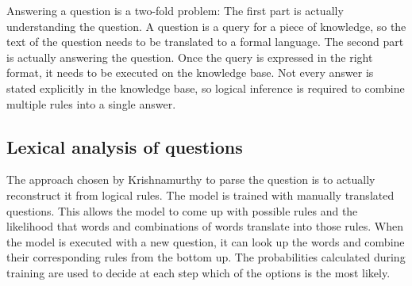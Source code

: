 Answering a question is a two-fold problem: The first part is actually understanding the question. A question is a query for a piece of knowledge, so the text of the question needs to be translated to a formal language. The second part is actually answering the question. Once the query is expressed in the right format, it needs to be executed on the knowledge base. Not every answer is stated explicitly in the knowledge base, so logical inference is required to combine multiple rules into a single answer. 
\subsection{Lexical analysis of questions}
The approach chosen by Krishnamurthy \cite{probseman} to parse the question is to actually reconstruct it from logical rules. The model is trained with manually translated questions. This allows the model to come up with possible rules and the likelihood that words and combinations of words translate into those rules. When the model is executed with a new question, it can look up the words and combine their corresponding rules from the bottom up. The probabilities calculated during training are used to decide at each step which of the options is the most likely.



